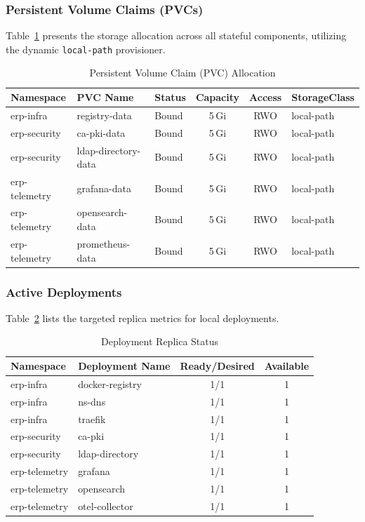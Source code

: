 \documentclass{article}
\begin{document}
\subsubsection{Persistent Volume Claims (PVCs)}
Table~\ref{tab:pvcs} presents the storage allocation across all stateful components,
utilizing the dynamic \texttt{local-path} provisioner.

\begin{table}[H]
\centering
\caption{Persistent Volume Claim (PVC) Allocation}
\label{tab:pvcs}
\small
\begin{tabular}{lllccl}
\toprule
\textbf{Namespace} & \textbf{PVC Name} & \textbf{Status} & \textbf{Capacity} & \textbf{Access} & \textbf{StorageClass} \\
\midrule
erp-infra & registry-data & Bound & 5\,Gi & RWO & local-path \\
erp-security & ca-pki-data & Bound & 5\,Gi & RWO & local-path \\
erp-security & ldap-directory-data & Bound & 5\,Gi & RWO & local-path \\
erp-telemetry & grafana-data & Bound & 5\,Gi & RWO & local-path \\
erp-telemetry & opensearch-data & Bound & 5\,Gi & RWO & local-path \\
erp-telemetry & prometheus-data & Bound & 5\,Gi & RWO & local-path \\
\bottomrule
\end{tabular}
\end{table}

\subsubsection{Active Deployments}
Table~\ref{tab:deployments} lists the targeted replica metrics for local deployments.

\begin{table}[H]
\centering
\caption{Deployment Replica Status}
\label{tab:deployments}
\small
\begin{tabular}{llcc}
\toprule
\textbf{Namespace} & \textbf{Deployment Name} & \textbf{Ready/Desired} & \textbf{Available} \\
\midrule
erp-infra & docker-registry & 1/1 & 1 \\
erp-infra & ns-dns & 1/1 & 1 \\
erp-infra & traefik & 1/1 & 1 \\
erp-security & ca-pki & 1/1 & 1 \\
erp-security & ldap-directory & 1/1 & 1 \\
erp-telemetry & grafana & 1/1 & 1 \\
erp-telemetry & opensearch & 1/1 & 1 \\
erp-telemetry & otel-collector & 1/1 & 1 \\
\bottomrule
\end{tabular}
\end{table}
\end{document}
